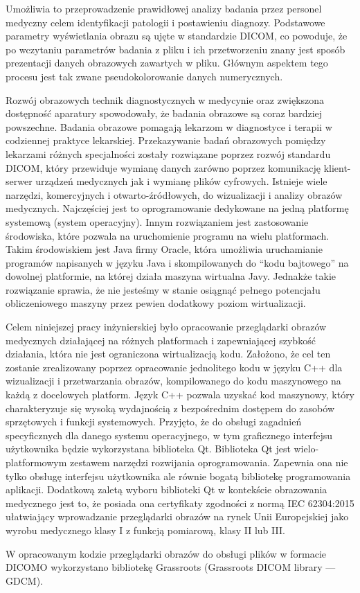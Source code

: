 Umożliwia to przeprowadzenie prawidłowej analizy badania przez personel medyczny celem identyfikacji patologii i postawieniu diagnozy.
Podstawowe parametry wyświetlania obrazu są ujęte w standardzie DICOM, co powoduje, że po wczytaniu parametrów badania z pliku i ich przetworzeniu znany jest sposób prezentacji danych obrazowych zawartych w pliku.
Głównym aspektem tego procesu jest tak zwane pseudokolorowanie danych numerycznych. 
\par
Rozwój obrazowych technik diagnostycznych w medycynie oraz zwiększona dostępność aparatury spowodowały, że badania obrazowe są coraz bardziej powszechne. Badania obrazowe pomagają lekarzom w diagnostyce i terapii w codziennej praktyce lekarskiej.
Przekazywanie badań obrazowych pomiędzy lekarzami różnych specjalności zostały rozwiązane poprzez rozwój standardu DICOM, który przewiduje wymianę danych zarówno poprzez komunikację klient-serwer urządzeń medycznych jak i wymianę plików cyfrowych. 
Istnieje wiele narzędzi, komercyjnych i otwarto-źródłowych, do wizualizacji i analizy obrazów medycznych.
Najczęściej jest to oprogramowanie dedykowane na jedną platformę systemową (system operacyjny).  
Innym rozwiązaniem jest zastosowanie środowiska, które pozwala na uruchomienie programu na wielu platformach. Takim środowiskiem jest Java firmy Oracle, która umożliwia uruchamianie programów napisanych w języku Java i skompilowanych do \enquote{kodu bajtowego} na dowolnej platformie, na której działa maszyna wirtualna Javy. Jednakże takie rozwiązanie sprawia, że nie jesteśmy w stanie osiągnąć pełnego potencjału obliczeniowego maszyny przez pewien dodatkowy poziom wirtualizacji.
\par
Celem niniejszej pracy inżynierskiej było opracowanie przeglądarki obrazów medycznych działającej na różnych platformach i zapewniającej szybkość działania, która nie jest ograniczona wirtualizacją kodu.
Założono, że cel ten zostanie zrealizowany poprzez opracowanie jednolitego kodu w języku C++ dla wizualizacji i przetwarzania obrazów, kompilowanego do kodu maszynowego na każdą z docelowych platform.
Język C++ pozwala uzyskać kod maszynowy, który charakteryzuje się wysoką wydajnością z bezpośrednim dostępem do zasobów sprzętowych i funkcji systemowych.
Przyjęto, że do obsługi zagadnień specyficznych dla danego systemu operacyjnego, w tym graficznego interfejsu użytkownika będzie wykorzystana biblioteka Qt.
Biblioteka Qt jest wielo-platformowym zestawem narzędzi rozwijania oprogramowania.
Zapewnia ona nie tylko obsługę interfejsu użytkownika ale równie bogatą bibliotekę programowania aplikacji.
Dodatkową zaletą wyboru biblioteki Qt w kontekście obrazowania medycznego jest to, że posiada ona certyfikaty zgodności z normą IEC 62304:2015 ułatwiający wprowadzanie przeglądarki obrazów na rynek Unii Europejskiej jako wyrobu medycznego klasy I z funkcją pomiarową, klasy II lub III.  
\par
W opracowanym kodzie przeglądarki obrazów do obsługi plików w formacie DICOMO wykorzystano bibliotekę Grassroots (Grassroots DICOM library --- GDCM).